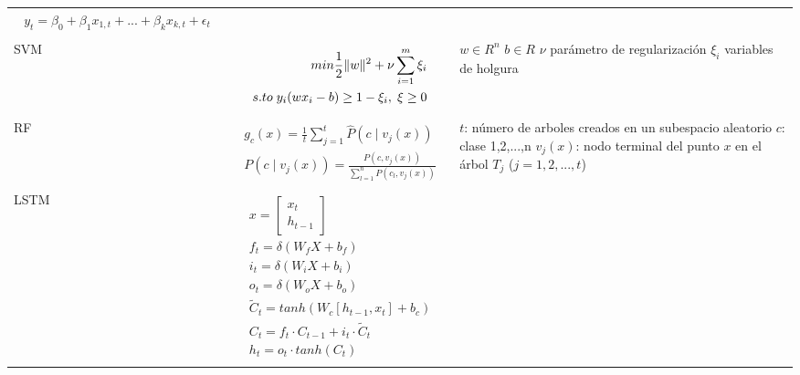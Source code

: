 \begin{table}
\begin{adjustbox}{width=0.95\textwidth}
\begin{tabular} {m{2cm} m{9cm} m{7cm}}
\begin{align}
\begin{split}
				y_{t} = \beta_{0}+\beta_{1}x_{1,t}+...+\beta_{k}x_{k,t}+\epsilon_{t}
			\end{split}
		\end{align}
		&
		\\
		SVM 		&	
		\begin{align}
			\label{eqn:6}
			\begin{split}
				min \frac{1}{2}\|w\|^{2}+\nu\sum_{i=1}^{m}\xi_{i}\\
				s.to\hspace{0.1cm} y_{i}(wx_{i}-b)\geq  1-\xi_{i},\hspace{0.1cm} \xi\geq 0
			\end{split}
		\end{align}
		&
		$w\in R^{n}$\newline
		$b\in R$\newline 
		$\nu$ parámetro de regularización \newline
		$\xi_{i}$ variables de holgura
		\\
		RF 		&	
		\begin{align}
			\label{eqn:8}
			\begin{split}
				g_{c}(x)=\frac{1}{t}\sum_{j=1}^{t}\hat{P}(c\mid v_{j}(x))\\
				P(c\mid v_{j}(x)) = \frac{P(c, v_{j}(x))}{\sum_{l=1}^{n}P(c_{l},v_{j}(x))}	
			\end{split}
		\end{align}
		&
		$t$: número de arboles creados en un subespacio aleatorio\newline
		$c$: clase 1,2,...,n\newline
		$v_{j}(x)$: nodo terminal del punto $x$ en el árbol $T_{j}$ ($j = 1,2,...,t$)
		\\
		LSTM 	&	
		\begin{align}
			\label{eqn:7}
			\begin{split}
				x = \left[ \begin{array}{c} x_{t} \\ h_{t-1} \end{array} \right]\\
				f_{t} = \delta(W_{f}X+b_{f})\\
				i_{t} = \delta(W_{i}X+b_{i})\\
				o_{t} = \delta(W_{o}X+b_{o})\\
				\tilde{C}_{t} = tanh (W_{c}[h_{t-1},x_{t}]+b_{c})\\
				C_{t} = f_{t} \cdot C_{t-1}+i_{t} \cdot \tilde{C}_{t}\\
				h_{t} = o_{t}\cdot tanh(C_{t})
			\end{split}

\end{align}
\end{tabular}
\end{adjustbox}
\end{table}
